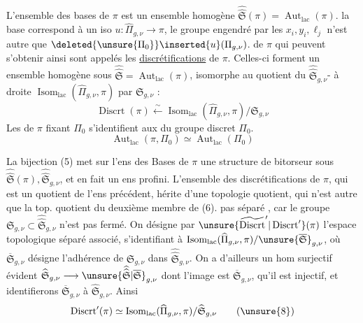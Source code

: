 L'ensemble des bases de $\pi$ est un ensemble homogène   $\widehat{\widehat{\mathfrak S}}(\pi)=\operatorname{Aut}_{\mathrm{lac}}(\pi)$.  la  base correspond à un iso $u:\widehat{\Pi}_{g,\nu}\longrightarrow\pi$, le groupe  engendré par les $x_i,y_i,\ell_j$ n'est autre que $\deleted{\unsure{\Pi_0}}\inserted{u}(\Pi_{g,\nu})$.   de $\pi$ qui peuvent s'obtenir ainsi sont appelés les \uline{discrétifications} de $\pi$. Celles-ci forment un ensemble homogène sous $\widehat{\widehat{\mathfrak S}}=\operatorname{Aut}_{\mathrm{lac}}(\pi)$,  isomorphe au quotient du $\widehat{\widehat{\mathfrak S}}_{g,\nu}$- à droite $\operatorname{Isom}_{\mathrm{lac}}(\widehat{\Pi}_{g,\nu},\pi)$ par $\mathfrak S_{g,\nu}$ :
\[
\operatorname{Discrt}(\pi) \xleftarrow{\sim} \operatorname{Isom}_{\mathrm{lac}}(\widehat{\Pi}_{g,\nu},\pi)/\mathfrak S_{g,\nu}
\tag{6}
\]
Les   de $\pi$ fixant  $\Pi_0$ s'identifient aux  du groupe discret  $\Pi_0$.
\[
\operatorname{Aut}_{\mathrm{lac}}(\pi,\Pi_0)\simeq\operatorname{Aut}_{\mathrm{lac}}(\Pi_0)
\tag{7}
\]



La bijection (5) met sur l'ens des Bases de $\pi$ une structure de bitorseur sous $\widehat{\widehat{\mathfrak S}}(\pi),\widehat{\widehat{\mathfrak S}}_{g,\nu}$, et    en fait un ens profini. L'ensemble des discrétifications de $\pi$, qui est un quotient de l'ens précédent, hérite d'une topologie quotient, qui n'est autre que la top. quotient du deuxième membre de (6).   pas séparé , car le groupe $\mathfrak S_{g,\nu}\subset\widehat{\widehat{\mathfrak S}}_{g,\nu}$ n'est pas fermé. On désigne par $\unsure{\widetilde{\operatorname{Discrt}}'|\operatorname{Discrt}'}(\pi)$ l'espace topologique séparé associé, s'identifiant à $\operatorname{Isom}_{\mathrm{lac}}(\widehat{\Pi}_{g,\nu},\pi)/\unsure{\overline{\mathfrak S}}_{g,\nu}$, où $\overline{\mathfrak S}_{g,\nu}$ désigne l'adhérence de $\mathfrak S_{g,\nu}$ dans $\widehat{\widehat{\mathfrak S}}_{g,\nu}$. On a d'ailleurs un hom surjectif évident $\widehat{\mathfrak S}_{g,\nu}\longrightarrow\unsure{\widehat{\widehat{\mathfrak S}}|\overline{\mathfrak S}}_{g,\nu}$ dont l'image est $\overline{\mathfrak S}_{g,\nu}$,  qu'il est injectif, et identifierons $\overline{\mathfrak S}_{g,\nu}$ à $\widehat{\mathfrak S}_{g,\nu}$. Ainsi
\[
\operatorname{Discrt}'(\pi)\simeq\operatorname{Isom}_{\mathrm{lac}}(\widehat{\Pi}_{g,\nu},\pi)/\widehat{\mathfrak S}_{g,\nu}
\tag{\unsure{8}}
\]

